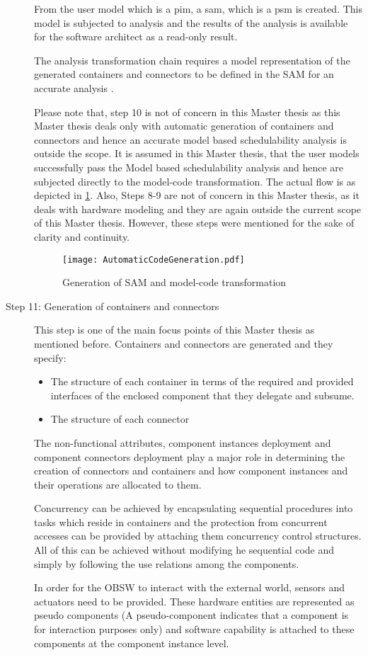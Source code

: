 \begin{description}
From the user model which is a \ac{pim}, a \ac{sam}, which is a \ac{psm} is created. This model is subjected to analysis and the results of the analysis is available for the software architect as a read-only result. 

The analysis transformation chain requires a model representation of the generated containers and connectors to be defined in the SAM for an accurate analysis \cite{CompBasedProcess}.

Please note that, step 10 is not of concern in this Master thesis as this Master thesis deals only with automatic generation of containers and connectors and hence an accurate model based schedulability analysis is outside the scope. It is assumed in this Master thesis, that the user models successfully pass the Model based schedulability analysis and hence are  subjected directly to the model-code transformation. The actual flow is as depicted in \cref{fig: Automatic code generation}. Also, Steps 8-9 are not of concern in this Master thesis, as it deals with hardware modeling and they are again outside the current scope of this Master thesis. However, these steps were mentioned for the sake of clarity and continuity.

\begin{figure}[h]
	\centering
	\texttt{[image: AutomaticCodeGeneration.pdf]}
	\caption{Generation of SAM and model-code transformation}
	\label{fig: Automatic code generation}
\end{figure}

\item [Step 11: Generation of containers and connectors]  This step is one of the main focus points of this Master thesis as mentioned before. Containers and connectors are generated and they specify:
\begin{itemize}
\item The structure of each container in terms of the required and provided interfaces of the enclosed component that they delegate and subsume.
\item The structure of each connector 
\end{itemize} 
The non-functional attributes, component instances deployment and component connectors deployment play a major role in determining the creation of connectors and containers and how component instances and their operations are allocated to them.

Concurrency can be achieved by encapsulating sequential procedures into tasks which reside in containers and the protection from concurrent accesses can be provided by attaching them concurrency control structures. All of this can be achieved without modifying he sequential code and simply by following the use relations among the components.

In order for the OBSW to interact with the external world, sensors and actuators need to be provided. These hardware entities are represented as pseudo components (A pseudo-component indicates that a component is for interaction purposes only) and software capability is attached to these components at the component instance level.    
\end{description}

